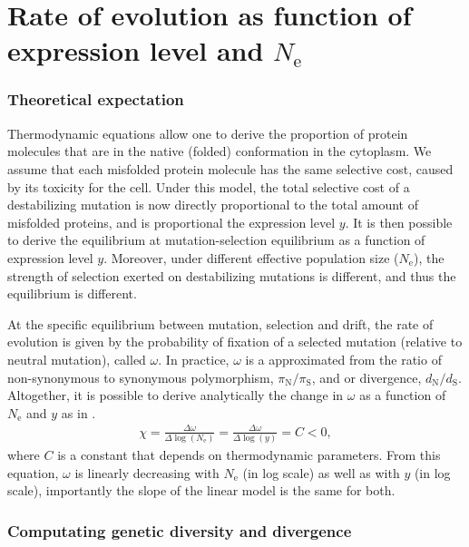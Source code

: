 \documentclass[10pt]{article}
\newcommand{\Ne}{N_{\text{e}}}
\newcommand{\dn}{d_{\text{N}}}
\newcommand{\ds}{d_{\text{S}}}
\newcommand{\dnds}{\dn / \ds}
\newcommand{\pin}{\pi_{\text{N}}}
\newcommand{\pis}{\pi_{\text{S}}}
\newcommand{\pinpis}{\pin / \pis}
\begin{document}
    \part*{Rate of evolution as function of expression level and $\Ne$}
    \tableofcontents
    \clearpage


    \section{Theoretical expectation}

    Thermodynamic equations allow one to derive the proportion of protein molecules that are in the native (folded) conformation in the cytoplasm.
    We assume that each misfolded protein molecule has the same selective cost, caused by its toxicity for the cell.
    Under this model, the total selective cost of a destabilizing mutation is now directly proportional to the total amount of misfolded proteins, and is proportional the expression level $y$.
    It is then possible to derive the equilibrium at mutation-selection equilibrium as a function of expression level $y$.
    Moreover, under different effective population size ($\Ne$), the strength of selection exerted on destabilizing mutations is different, and thus the equilibrium is different.

    At the specific equilibrium between mutation, selection and drift, the rate of evolution is given by the probability of fixation of a selected mutation (relative to neutral mutation), called $\omega$.
    In practice, $\omega$ is a approximated from the ratio of non-synonymous to synonymous polymorphism, $\pinpis$, and or divergence, $\dnds$.
    Altogether, it is possible to derive analytically the change in $\omega$ as a function of $\Ne$ and $y$ as in \textcite[eq.~18]{latrille_quantifying_2021}.
    \begin{align}
        \chi = \frac{ \Delta \omega}{\Delta \log (\Ne)} = \frac{ \Delta \omega}{\Delta \log (y)} = C < 0,
    \end{align}
    where $C$ is a constant that depends on thermodynamic parameters.
    From this equation, $\omega$ is linearly decreasing with $\Ne$ (in log scale) as well as with $y$ (in log scale), importantly the slope of the linear model is the same for both.


    \section{Computating genetic diversity and divergence}
\end{document}
